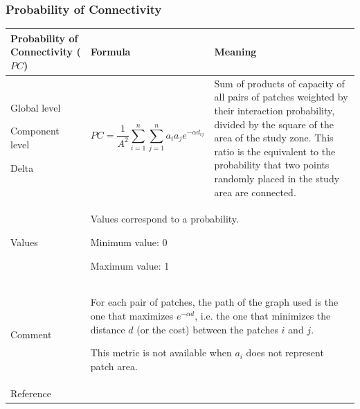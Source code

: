 \documentclass{article}
\begin{document}
\subsubsection{Probability of Connectivity}
\label{metric_PC}
\begin{table}[H]
	\begin{tabular}{|m{3.24cm}|m{4.4810004cm}m{7.924cm}|}
		\hline
		Probability of Connectivity ($PC$) &
		\multicolumn{1}{m{4.4810004cm}|}{Formula} &
		Meaning\\\hline
		Global level 
		
		Component level
		
		Delta &
		\multicolumn{1}{m{4.4810004cm}|}{\begin{equation*}
			\mathit{PC}=\frac{1}{{A}^{2}}\sum _{i=1}^{n}{\sum
				_{j=1}^{n}{{a}_{i}}}{{a}_{j} e}^{-\alpha
				{d}_{\mathit{ij}}}
			\end{equation*}
		} &
		Sum of products of capacity of all pairs of patches weighted by their interaction probability, divided by the square of the area of the study zone. This ratio is the equivalent to the probability that two points randomly placed in the study area are connected.\\\hline
		Values &
		\multicolumn{2}{m{12.6050005cm}|}{Values correspond to a probability.
			
			Minimum value: 0
			
			Maximum value: 1
		}\\\hline
		Comment &
		\multicolumn{2}{m{12.6050005cm}|}{For each pair of patches, the path of
			the graph used is the one that maximizes ${e}^{-\mathit{\alpha d}}$,
			i.e. the one that minimizes the distance $d$ (or the cost) between the
			patches $i$ and $j$.
			
			This metric is not available when $a_i$ does not represent patch area.
		}\\\hline
		Reference &
		\multicolumn{2}{m{12.6050005cm}|}{
			\cite{Saura2007}
		}\\\hline
	\end{tabular}
\end{table}
\end{document}
